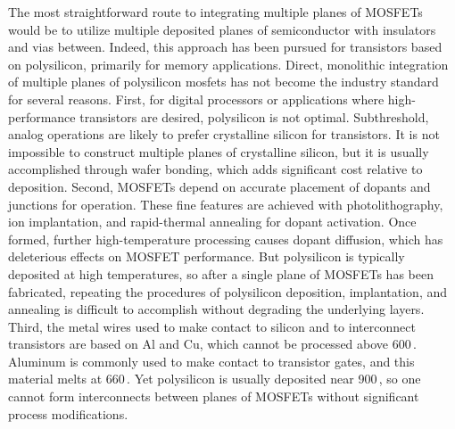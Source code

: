 \documentclass[twocolumn]{article}
\begin{document}
The most straightforward route to integrating multiple planes of MOSFETs would be to utilize multiple deposited planes of semiconductor with insulators and vias between. Indeed, this approach has been pursued for transistors based on polysilicon, primarily for memory applications. Direct, monolithic integration of multiple planes of polysilicon mosfets has not become the industry standard for several reasons. First, for digital processors or applications where high-performance transistors are desired, polysilicon is not optimal. Subthreshold, analog operations are likely to prefer crystalline silicon for transistors. It is not impossible to construct multiple planes of crystalline silicon, but it is usually accomplished through wafer bonding, which adds significant cost relative to deposition. Second, MOSFETs depend on accurate placement of dopants and junctions for operation. These fine features are achieved with photolithography, ion implantation, and rapid-thermal annealing for dopant activation. Once formed, further high-temperature processing causes dopant diffusion, which has deleterious effects on MOSFET performance. But polysilicon is typically deposited at high temperatures, so after a single plane of MOSFETs has been fabricated, repeating the procedures of polysilicon deposition, implantation, and annealing is difficult to accomplish without degrading the underlying layers. Third, the metal wires used to make contact to silicon and to interconnect transistors are based on Al and Cu, which cannot be processed above 600\,\textcelsius. Aluminum is commonly used to make contact to transistor gates, and this material melts at 660\,\textcelsius. Yet polysilicon is usually deposited near 900\,\textcelsius, so one cannot form interconnects between planes of MOSFETs without significant process modifications. 
\end{document}
